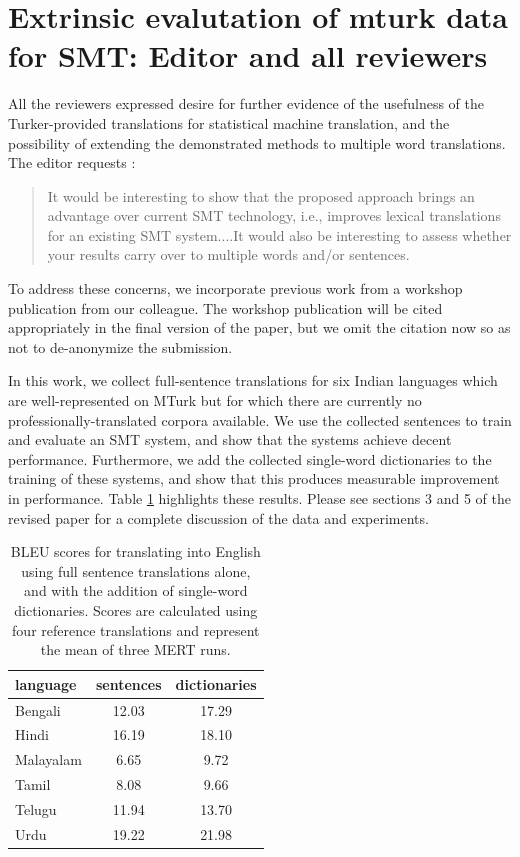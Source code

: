 \documentclass[11pt]{article}
\begin{document}
\section{Extrinsic evalutation of mturk data for SMT: Editor and all reviewers}

All the reviewers expressed desire for further evidence of the usefulness of the Turker-provided translations for statistical machine translation, and the possibility of extending the demonstrated methods to multiple word translations. The editor requests :

\begin{quote}
It would be interesting to show that the proposed approach brings an advantage over current SMT technology, i.e., improves lexical translations for an existing SMT system....It would also be interesting to assess whether your results carry over to multiple words and/or sentences. 
\end{quote}

To address these concerns, we incorporate previous work from a workshop publication from our colleague. The workshop publication will be cited appropriately in the final version of the paper, but we omit the citation now so as not to de-anonymize the submission. 

In this work, we collect full-sentence translations for six Indian languages which are well-represented on MTurk but for which there are currently no professionally-translated corpora available. We use the collected sentences to train and evaluate an SMT system, and show that the systems achieve decent performance. Furthermore, we add the collected single-word dictionaries to the training of these systems, and show that this produces measurable improvement in performance. Table \ref{dictionary_bleu} highlights these results. Please see sections 3 and 5 of the revised paper for a complete discussion of the data and experiments. 

\begin{table}[t]
\centering
\begin{tabular}{l|cc}
  language  & sentences &  dictionaries \\
  \hline\hline
  Bengali    &  12.03 & 17.29\\
  Hindi      & 16.19 & 18.10\\  
  Malayalam    &  6.65 & 9.72\\      
  Tamil      & 8.08 & 9.66 \\  
  Telugu     & 11.94 & 13.70\\  
  Urdu        & 19.22 & 21.98\\   
\end{tabular}
\caption{BLEU scores for translating into English using full sentence translations alone, and with the addition of single-word dictionaries. Scores are calculated using four reference translations and represent the mean of three MERT runs.}
\label{dictionary_bleu}
\end{table}
\end{document}

